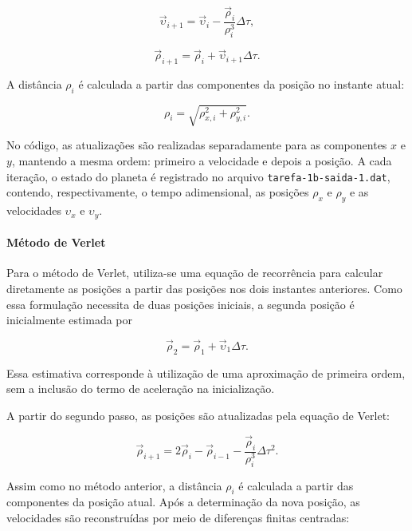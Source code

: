 \documentclass[12pt,a4paper]{article}
\begin{document}
\begin{equation}
    \vec{\upsilon}_{i+1}
    =
    \vec{\upsilon}_i
    -
    \frac{\vec{\rho}_i}{\rho_i^3}\Delta\tau,
\end{equation}

\begin{equation}
    \vec{\rho}_{i+1}
    =
    \vec{\rho}_i
    +
    \vec{\upsilon}_{i+1}\Delta\tau.
\end{equation}

A distância $\rho_i$ é calculada a partir das componentes
da posição no instante atual:

\begin{equation}
    \rho_i =
    \sqrt{\rho_{x,i}^2+\rho_{y,i}^2}.
\end{equation}

No código, as atualizações são realizadas separadamente
para as componentes $x$ e $y$, mantendo a mesma ordem:
primeiro a velocidade e depois a posição. A cada iteração,
o estado do planeta é registrado no arquivo
\texttt{tarefa-1b-saida-1.dat}, contendo, respectivamente,
o tempo adimensional, as posições $\rho_x$ e $\rho_y$ e
as velocidades $\upsilon_x$ e $\upsilon_y$.

\paragraph{Método de Verlet}

Para o método de Verlet, utiliza-se uma equação de
recorrência para calcular diretamente as posições a partir
das posições nos dois instantes anteriores. Como essa
formulação necessita de duas posições iniciais, a segunda
posição é inicialmente estimada por

\begin{equation}
    \vec{\rho}_2 =
    \vec{\rho}_1 +
    \vec{\upsilon}_1\Delta\tau.
\end{equation}

Essa estimativa corresponde à utilização de uma aproximação
de primeira ordem, sem a inclusão do termo de aceleração
na inicialização.

A partir do segundo passo, as posições são atualizadas
pela equação de Verlet:

\begin{equation}
    \vec{\rho}_{i+1}
    =
    2\vec{\rho}_i-\vec{\rho}_{i-1}
    -
    \frac{\vec{\rho}_i}{\rho_i^3}
    \Delta\tau^2.
\end{equation}

Assim como no método anterior, a distância $\rho_i$ é
calculada a partir das componentes da posição atual.
Após a determinação da nova posição, as velocidades são
reconstruídas por meio de diferenças finitas centradas:
\end{document}
